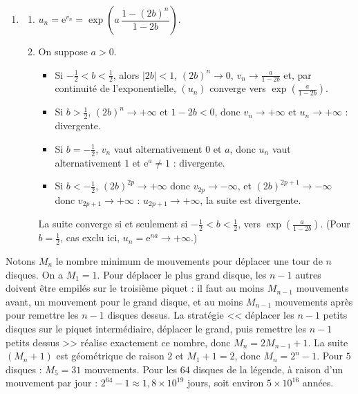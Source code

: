 \begin{corrige}
\begin{sol}
\begin{enumerate}
\begin{enumerate}
      \end{enumerate}
\item \begin{enumerate}
      \item $u_n = \mathrm{e}^{v_n} = \exp\left( a\, \dfrac{1 - (2b)^n}{1 - 2b} \right)$.
      \item On suppose $a > 0$.
            \begin{itemize}
            \item Si $-\frac{1}{2} < b < \frac{1}{2}$, alors $|2b| < 1$, $(2b)^n \to 0$, $v_n \to \frac{a}{1 - 2b}$ et, par continuit\'e de l'exponentielle,
                  $(u_n)$ converge vers $\exp\left( \frac{a}{1 - 2b} \right)$.
            \item Si $b > \frac{1}{2}$, $(2b)^n \to +\infty$ et $1 - 2b < 0$, donc $v_n \to +\infty$ et $u_n \to +\infty$ : divergente.
            \item Si $b = -\frac{1}{2}$, $v_n$ vaut alternativement $0$ et $a$, donc $u_n$ vaut alternativement $1$ et $\mathrm{e}^a \neq 1$ : divergente.
            \item Si $b < -\frac{1}{2}$, $(2b)^{2p} \to +\infty$ donc $v_{2p} \to -\infty$, et $(2b)^{2p+1} \to -\infty$ donc $v_{2p+1} \to +\infty$ :
                  $u_{2p+1} \to +\infty$, la suite est divergente.
            \end{itemize}
            La suite converge si et seulement si $-\frac{1}{2} < b < \frac{1}{2}$, vers $\exp\left( \frac{a}{1 - 2b} \right)$.
            (Pour $b = \frac{1}{2}$, cas exclu ici, $u_n = \mathrm{e}^{na} \to +\infty$.)
      \end{enumerate}
\end{enumerate}
\end{sol}
%
\begin{sol}
Notons $M_n$ le nombre minimum de mouvements pour d\'eplacer une tour de $n$ disques. On a $M_1 = 1$.
Pour d\'eplacer le plus grand disque, les $n - 1$ autres doivent \^etre empil\'es sur le troisi\`eme piquet : il faut au moins $M_{n-1}$ mouvements avant,
un mouvement pour le grand disque, et au moins $M_{n-1}$ mouvements apr\`es pour remettre les $n-1$ disques dessus.
La strat\'egie << d\'eplacer les $n-1$ petits disques sur le piquet interm\'ediaire, d\'eplacer le grand, puis remettre les $n-1$ petits dessus >>
r\'ealise exactement ce nombre, donc $M_n = 2 M_{n-1} + 1$.
La suite $(M_n + 1)$ est g\'eom\'etrique de raison $2$ et $M_1 + 1 = 2$, donc $M_n = 2^n - 1$.
Pour $5$ disques : $M_5 = 31$ mouvements. Pour les $64$ disques de la l\'egende, \`a raison d'un mouvement par jour :
$2^{64} - 1 \approx 1{,}8 \times 10^{19}$ jours, soit environ $5 \times 10^{16}$ ann\'ees.
\end{sol}
\end{corrige}

